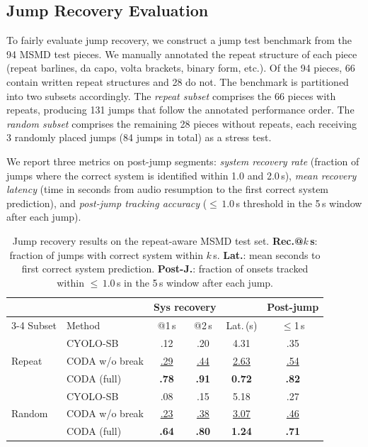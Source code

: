 \documentclass{article}
\newcommand{\first}[1]{\textcolor{best}{\textbf{#1}}}
\newcommand{\second}[1]{\textcolor{second}{\underline{#1}}}
\begin{document}
\subsection{Jump Recovery Evaluation}\label{sec:jump}
 
To fairly evaluate jump recovery, we construct a jump test benchmark from the 94 MSMD test pieces. We manually annotated the repeat structure of each piece (repeat barlines, da capo, volta brackets, binary form, etc.). Of the 94 pieces, 66 contain written repeat structures and 28 do not. The benchmark is partitioned into two subsets accordingly. The \emph{repeat subset} comprises the 66 pieces with repeats, producing 131 jumps that follow the annotated performance order. The \emph{random subset} comprises the remaining 28 pieces without repeats, each receiving 3 randomly placed jumps (84 jumps in total) as a stress test.
 
We report three metrics on post-jump segments: \emph{system recovery rate}
(fraction of jumps where the correct system is identified within 1.0 and
2.0\,s), \emph{mean recovery latency} (time in seconds from audio resumption to the first correct system
prediction), and \emph{post-jump tracking accuracy} (${\leq}\,1.0$\,s threshold
in the 5\,s window after each jump).
 
\begin{table}[h]
\centering
\caption{Jump recovery results on the repeat-aware MSMD test set.
\textbf{Rec.@$k$\,s}: fraction of jumps with correct system within $k$\,s.
\textbf{Lat.}: mean seconds to first correct system prediction.
\textbf{Post-J.}: fraction of onsets tracked within ${\leq}\,1.0$\,s in the 5\,s window after each jump.}
\label{tab:jump}
\scriptsize
\setlength{\tabcolsep}{2.5pt}
\begin{tabular}{@{}ll cc c c@{}}
\toprule
& & \multicolumn{2}{c}{Sys recovery} & & Post-jump \\
\cmidrule(lr){3-4}
Subset & Method & @1\,s & @2\,s & Lat.\,(s) & ${\leq}$1\,s \\
\midrule
\multirow{3}{*}{Repeat}
 & CYOLO-SB       & .12   & .20   & 4.31   & .35 \\
 & CODA w/o break & \second{.29}   & \second{.44}   & \second{2.63}   & \second{.54} \\
\rowcolor{rowhl}
 & CODA (full)    & \first{.78} & \first{.91} & \first{0.72} & \first{.82} \\
\midrule
\multirow{3}{*}{Random}
 & CYOLO-SB       & .08   & .15   & 5.18   & .27 \\
 & CODA w/o break & \second{.23}   & \second{.38}   & \second{3.07}   & \second{.46} \\
\rowcolor{rowhl}
 & CODA (full)    & \first{.64} & \first{.80} & \first{1.24} & \first{.71} \\
\bottomrule
\end{tabular}
\end{table}
 
\end{document}

